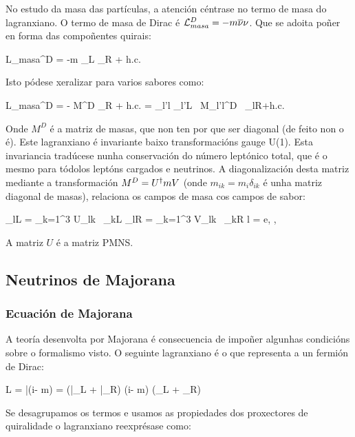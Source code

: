 \documentclass[a4paper,12pt]{article}
\begin{document}

No estudo da masa das partículas, a atención céntrase no termo de masa do lagranxiano. O termo de masa de Dirac é $ \mathcal{L}_{masa}^D = -m \overline{\nu} \nu$. Que se adoita poñer en forma das compoñentes quirais:

\beq \label{masaDirac}
 \chula L_{masa}^D = -m \barra\nu_L \nu_R + h.c.
\eeq

Isto pódese xeralizar para varios sabores como:

\beq
\chula L_{masa}^D = - M^D \rvec\nu_R + h.c. = \sum_{l'l} \barra\nu_{l'L} \, M_{l'l}^D \, \nu_{lR}+h.c.
\eeq

Onde $M^D$ é a matriz de masas, que non ten por que ser diagonal (de feito non o é). Este lagranxiano é invariante baixo transformacións gauge U(1). Esta invariancia tradúcese nunha conservación do número leptónico total, que é o mesmo para tódolos leptóns cargados e neutrinos. A diagonalización desta matriz mediante a transformación $M^D = U^\dagger m V$ (onde $ m_{ik} = m_i \delta_{ik} $ é unha matriz diagonal de masas), relaciona os campos de masa cos campos de sabor:

\beq
\nu_{lL} = \sum_{k=1}^{3} U_{lk} \, \nu_{kL} \qquad\qquad \nu_{lR} = \sum_{k=1}^{3} V_{lk} \, \nu_{kR}
\qquad \qquad l = e, \mu, \tau
\eeq

A matriz $U$ é a matriz PMNS.

\subsection{Neutrinos de Majorana}\label{Majorana}

\subsubsection{Ecuación de Majorana}\label{ecuacionmajorana}
A teoría desenvolta por Majorana é consecuencia de impoñer algunhas condicións sobre o formalismo visto. O seguinte lagranxiano é o que representa a un fermión de Dirac:

\beq
\chula L = \bar \psi (i\slx\partial - m) \psi =  (\bar \psi_L + \bar \psi_R) (i\slx\partial - m) (\psi_L + \psi_R)
\eeq

Se desagrupamos os termos e usamos as propiedades dos proxectores de quiralidade o lagranxiano reexprésase como:
\end{document}
